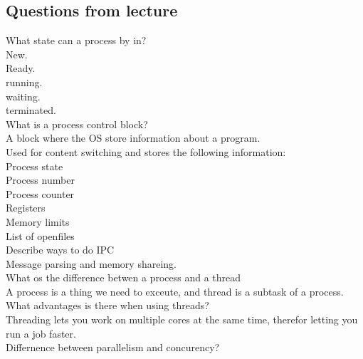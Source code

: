\documentclass[a4paper,10pt,titlepage]{report}
\begin{document}
\subsection{Questions from lecture}
What state can a process by in?\\
\hspace{10mm}New.\\
\hspace{10mm}Ready.\\
\hspace{10mm}running.\\
\hspace{10mm}waiting.\\
\hspace{10mm}terminated.\\
\vspace{5mm}
What is a process control block?\\
\hspace{10mm}A block where the OS store information about a program.\\ 
\hspace{10mm}Used for content switching and stores the following information:\\
\hspace{20mm}Process state\\
\hspace{20mm}Process number\\
\hspace{20mm}Process counter\\
\hspace{20mm}Registers\\
\hspace{20mm}Memory limits\\
\hspace{20mm}List of openfiles\\


\vspace{5mm}
Describe ways to do IPC\\
\hspace{10mm}Message parsing and memory shareing. \\
\vspace{5mm}
What os the difference betwen a process and a thread\\
\hspace{10mm}A process is a thing we need to exceute, and thread is a subtask of a process.\\
\vspace{5mm}
What advantages is there when using threads?\\
\hspace{10mm}Threading lets you work on multiple cores at the same time, therefor letting you run a job faster.\\
\vspace{5mm}
Differnence between parallelism and concurency?\\
\end{document}
